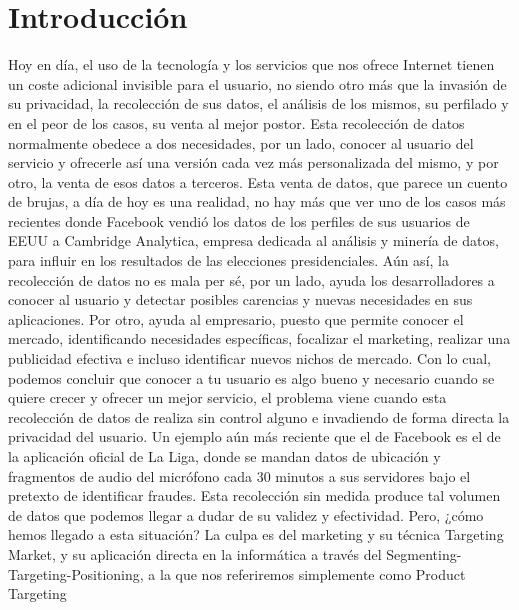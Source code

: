 \documentclass[12pt,a4paper,oneside]{book} %
\begin{document}
\chapter{Introducción}
Hoy en día, el uso de la tecnología y los servicios que nos ofrece Internet tienen un coste adicional invisible para el usuario, no siendo otro más que la invasión de su privacidad, la recolección de sus datos, el análisis de los mismos, su perfilado y en el peor de los casos, su venta al mejor postor.
\newline \newline
Esta recolección de datos normalmente  obedece a dos necesidades, por un lado, conocer al usuario del servicio y ofrecerle así una versión cada vez más personalizada del mismo, y por otro, la venta de esos datos a terceros. 
\newline \newline
Esta venta de datos, que parece un cuento de brujas, a día de hoy es una realidad, no hay más que ver uno de los casos más recientes donde Facebook vendió los datos de los perfiles de sus usuarios de EEUU a Cambridge Analytica, empresa dedicada al análisis y minería de datos, para influir en los resultados de las elecciones presidenciales. 
\newline \newline
Aún así, la recolección de datos no es mala per sé, por un lado, ayuda los desarrolladores a conocer al usuario y detectar posibles carencias y nuevas necesidades en sus aplicaciones. Por otro, ayuda al empresario, puesto que permite conocer el mercado, identificando necesidades específicas, focalizar el marketing, realizar una publicidad efectiva e incluso identificar nuevos nichos de mercado. 
\newline \newline
Con lo cual, podemos concluir que conocer a tu usuario es algo bueno y necesario cuando se quiere crecer y ofrecer un mejor servicio, el problema viene cuando esta recolección de datos de realiza sin control alguno e invadiendo de forma directa la privacidad del usuario. Un ejemplo aún más reciente que el de Facebook es el de la aplicación oficial de La Liga, donde se mandan datos de ubicación y fragmentos de audio del micrófono cada 30 minutos a sus servidores bajo el pretexto de identificar fraudes. Esta recolección sin medida produce tal volumen de datos que podemos llegar a dudar de su validez y efectividad. 
\newline \newline
Pero, ¿cómo hemos llegado a esta situación? La culpa es del marketing y su técnica Targeting Market, y su aplicación directa en la informática a través del Segmenting-Targeting-Positioning, a la que nos referiremos simplemente como Product Targeting
\end{document}
